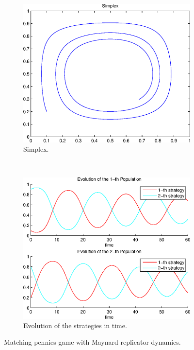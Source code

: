 \begin{figure}[h]
  \centering
  \begin{subfigure}[b]{0.45\textwidth}
	  \includegraphics[width=\textwidth]{./images/test2_simplex_maynard_rd.eps}
	  \caption{Simplex.}
	  \label{fig:test2_simplex_maynard_rd}
  \end{subfigure}
  ~ 
  \begin{subfigure}[b]{0.45\textwidth}
	  \includegraphics[width=\textwidth]{./images/test2_ev_maynard_rd.eps}
	  \caption{Evolution of the strategies in time.}
	  \label{fig:test2_ev_maynard_rd}
  \end{subfigure}
  \caption{Matching pennies game with Maynard replicator dynamics.}
  \label{fig:mp_game_maynard_rd}
\end{figure}



